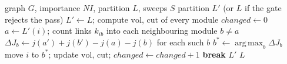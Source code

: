 \documentclass[conference]{IEEEtran}
\DeclareMathOperator*{\argmax}{arg\,max}
\begin{document}
\begin{algorithm}[!t]
\footnotesize
\caption{\textsc{SynwalkMoves}$(G,NI,L,S)$ (M6)}\label{alg:moves}
\begin{algorithmic}[1]
\Require graph $G$, importance $NI$, partition $L$, sweeps $S$
\Ensure partition $L'$ (or $L$ if the gate rejects the pass)
\State $L'\gets L$; compute $\mathrm{vol}$, $\mathrm{cut}$ of every module
  \State $changed\gets0$
    \State $a\gets L'(i)$; count links $k_{ib}$ into each neighbouring module $b\ne a$
    \State $\Delta J_b\gets j(a')+j(b')-j(a)-j(b)$ for each such $b$ 
    \State $b^{*}\gets\argmax_b\Delta J_b$
      \State move $i$ to $b^{*}$; update $\mathrm{vol}$, $\mathrm{cut}$; $changed\gets changed+1$
    \EndIf
  \EndFor
   \textbf{break} \EndIf
\EndFor
{}
  \State \Return $L'$
\Else
  \State \Return $L$ 
\EndIf
\end{algorithmic}
\end{algorithm}
\end{document}
